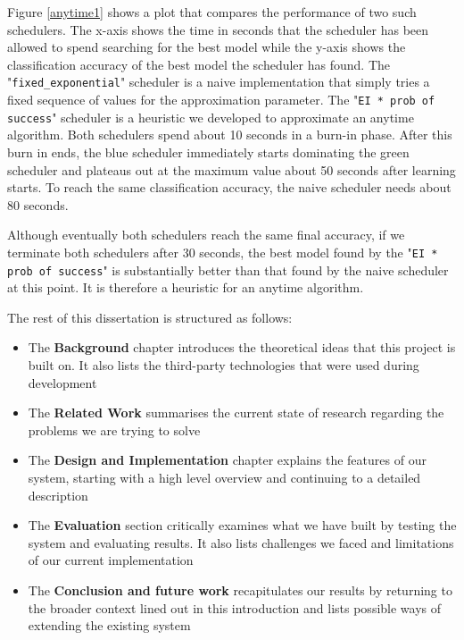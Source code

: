\documentclass[a4paper,12pt,twoside,openright]{report}
\begin{document}
Figure \ref{anytime1} shows a plot that compares the performance of two such schedulers. The x-axis shows the time in seconds that the scheduler has been allowed to spend searching for the best model while the y-axis shows the classification accuracy of the best model the scheduler has found. The "\texttt{fixed\_exponential}" scheduler is a naive implementation that simply tries a fixed sequence of values for the approximation parameter. The "\texttt{EI * prob of success}" scheduler is a heuristic we developed to approximate an anytime algorithm. Both schedulers spend about 10 seconds in a burn-in phase. After this burn in ends, the blue scheduler immediately starts dominating the green scheduler and plateaus out at the maximum value about 50 seconds after learning starts. To reach the same classification accuracy, the naive scheduler needs about 80 seconds.

Although eventually both schedulers reach the same final accuracy, if we terminate both schedulers after 30 seconds, the best model found by the "\texttt{EI * prob of success}" is substantially better than that found by the naive scheduler at this point. It is therefore a heuristic for an anytime algorithm.

The rest of this dissertation is structured as follows:
\begin{itemize}
	\item The \textbf{Background} chapter introduces the theoretical ideas that this project is built on. It also lists the third-party technologies that were used during development
	\item The \textbf{Related Work} summarises the current state of research regarding the problems we are trying to solve
	\item The \textbf{Design and Implementation} chapter explains the features of our system, starting with a high level overview and continuing to a detailed description
	\item The \textbf{Evaluation} section critically examines what we have built by testing the system and evaluating results. It also lists challenges we faced and limitations of our current implementation
	\item The \textbf{Conclusion and future work} recapitulates our results by returning to the broader context lined out in this introduction and lists possible ways of extending the existing system
\end{itemize}
\end{document}
